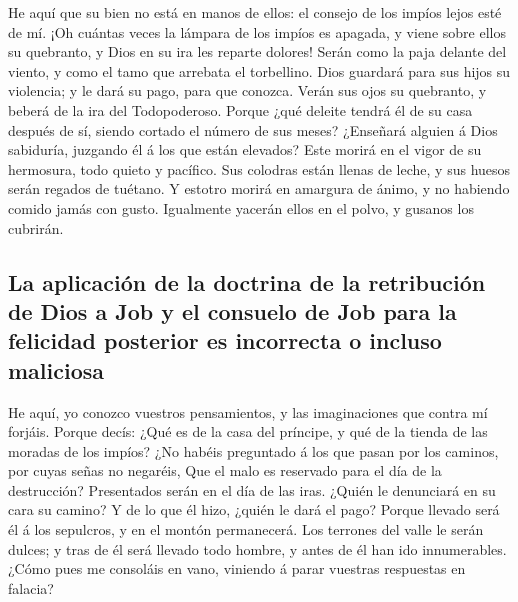  He aquí que su bien no está en manos de ellos: el consejo
de los impíos lejos esté de mí.  ¡Oh cuántas veces la
lámpara de los impíos es apagada, y viene sobre ellos su quebranto, y
Dios en su ira les reparte dolores!  Serán como la paja
delante del viento, y como el tamo que arrebata el torbellino.
 Dios guardará para sus hijos su violencia; y le dará su
pago, para que conozca.  Verán sus ojos su quebranto, y
beberá de la ira del Todopoderoso.  Porque ¿qué deleite
tendrá él de su casa después de sí, siendo cortado el número de sus
meses?  ¿Enseñará alguien á Dios sabiduría, juzgando él á
los que están elevados?  Este morirá en el vigor de su
hermosura, todo quieto y pacífico.  Sus colodras están
llenas de leche, y sus huesos serán regados de tuétano.  Y
estotro morirá en amargura de ánimo, y no habiendo comido jamás con
gusto.  Igualmente yacerán ellos en el polvo, y gusanos los
cubrirán.

\hypertarget{la-aplicaciuxf3n-de-la-doctrina-de-la-retribuciuxf3n-de-dios-a-job-y-el-consuelo-de-job-para-la-felicidad-posterior-es-incorrecta-o-incluso-maliciosa}{%
\subsection{La aplicación de la doctrina de la retribución de Dios a Job
y el consuelo de Job para la felicidad posterior es incorrecta o incluso
maliciosa}\label{la-aplicaciuxf3n-de-la-doctrina-de-la-retribuciuxf3n-de-dios-a-job-y-el-consuelo-de-job-para-la-felicidad-posterior-es-incorrecta-o-incluso-maliciosa}}

 He aquí, yo conozco vuestros pensamientos, y las
imaginaciones que contra mí forjáis.  Porque decís: ¿Qué es
de la casa del príncipe, y qué de la tienda de las moradas de los
impíos?  ¿No habéis preguntado á los que pasan por los
caminos, por cuyas señas no negaréis,  Que el malo es
reservado para el día de la destrucción? Presentados serán en el día de
las iras.  ¿Quién le denunciará en su cara su camino? Y de
lo que él hizo, ¿quién le dará el pago?  Porque llevado
será él á los sepulcros, y en el montón permanecerá.  Los
terrones del valle le serán dulces; y tras de él será llevado todo
hombre, y antes de él han ido innumerables.  ¿Cómo pues me
consoláis en vano, viniendo á parar vuestras respuestas en falacia?

